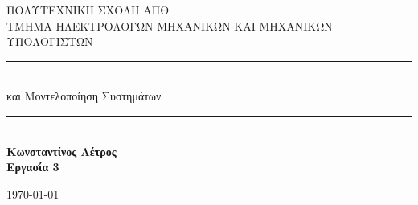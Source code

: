 \documentclass[12pt]{article}
\begin{document}
\author{Κωνσταντίνος Λέτρος 8851}

 \begin{titlepage} %
	\newcommand{\HRule}{\rule{\linewidth}{0.5mm}} %
	
	\center %
	
	
	\textsc{\LARGE ΠΟΛΥΤΕΧΝΙΚΗ ΣΧΟΛΗ ΑΠΘ}\\[1.5cm] %
	
	\textsc{\Large ΤΜΗΜΑ ΗΛΕΚΤΡΟΛΟΓΩΝ ΜΗΧΑΝΙΚΩΝ ΚΑΙ ΜΗΧΑΝΙΚΩΝ ΥΠΟΛΟΓΙΣΤΩΝ}\\[0.5cm] %
	
	 
	
	
	\HRule\\[0.4cm]
	
	{\huge{} και Μοντελοποίηση Συστημάτων}\\[0.4cm] %
	
	\HRule\\[1.5cm]
	
	{\huge\bfseries Κωνσταντίνος Λέτρος }\\[0.4cm]	
	\vfill	
	{\huge\bfseries Εργασία 3}\\[0.4cm]  %
	
	
	\vfill\vfill\vfill %
	
	{\large\today} %
	
	
	 
	
	\vfill %
	
\end{titlepage}
\end{document}
